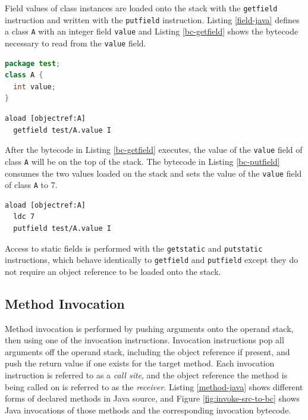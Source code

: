 Field values of class instances are loaded onto the stack with the \texttt{getfield} instruction and written with the \texttt{putfield} instruction.  Listing \ref{field-java} defines a class \texttt{A} with an integer field \texttt{value} and Listing \ref{bc-getfield} shows the bytecode necessary to read from the \texttt{value} field.

\begin{lstlisting}[language=Java,caption=Java class fields,label=field-java]
package test;
class A {
  int value;
}
\end{lstlisting}

\begin{lstlisting}[language=jvm-bytecode,caption=Load the value of a field onto the stack,label=bc-getfield]
  aload [objectref:A]
  getfield test/A.value I
\end{lstlisting}

After the bytecode in Listing \ref{bc-getfield} executes, the value of the \texttt{value} field of class \texttt{A} will be on the top of the stack.  The bytecode in Listing \ref{bc-putfield} consumes the two values loaded on the stack and sets the value of the \texttt{value} field of class \texttt{A} to 7.

\begin{lstlisting}[language=jvm-bytecode,caption=Set the value of a field,label=bc-putfield]
  aload [objectref:A]
  ldc 7
  putfield test/A.value I
\end{lstlisting}

Access to static fields is performed with the \texttt{getstatic} and \texttt{putstatic} instructions, which behave identically to \texttt{getfield} and \texttt{putfield} except they do not require an object reference to be loaded onto the stack.

\subsection{Method Invocation}

Method invocation is performed by pushing arguments onto the operand stack, then using one of the invocation instructions.  Invocation instructions pop all arguments off the operand stack, including the object reference if present, and push the return value if one exists for the target method.  Each invocation instruction is referred to as a \emph{call site}, and the object reference the method is being called on is referred to as the \emph{receiver}.  Listing \ref{method-java} shows different forms of declared methods in Java source, and Figure \ref{fig:invoke-src-to-bc} shows Java invocations of those methods and the corresponding invocation bytecode.

